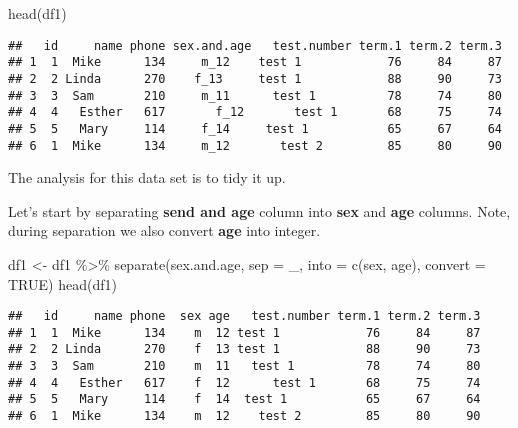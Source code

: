 \documentclass[
]{article}
\newenvironment{Shaded}{\begin{snugshade}}{\end{snugshade}}
\newcommand{\AttributeTok}[1]{\textcolor[rgb]{0.77,0.63,0.00}{#1}}
\newcommand{\ConstantTok}[1]{\textcolor[rgb]{0.00,0.00,0.00}{#1}}
\newcommand{\FunctionTok}[1]{\textcolor[rgb]{0.00,0.00,0.00}{#1}}
\newcommand{\NormalTok}[1]{#1}
\newcommand{\OtherTok}[1]{\textcolor[rgb]{0.56,0.35,0.01}{#1}}
\newcommand{\SpecialCharTok}[1]{\textcolor[rgb]{0.00,0.00,0.00}{#1}}
\newcommand{\StringTok}[1]{\textcolor[rgb]{0.31,0.60,0.02}{#1}}
\begin{document}
\begin{Shaded}
\begin{Highlighting}[]
\FunctionTok{head}\NormalTok{(df1)}
\end{Highlighting}
\end{Shaded}

\begin{verbatim}
##   id     name phone sex.and.age   test.number term.1 term.2 term.3
## 1  1  Mike      134     m_12    test 1            76     84     87
## 2  2 Linda      270    f_13     test 1            88     90     73
## 3  3  Sam       210     m_11      test 1          78     74     80
## 4  4   Esther   617       f_12       test 1       68     75     74
## 5  5   Mary     114     f_14     test 1           65     67     64
## 6  1  Mike      134     m_12       test 2         85     80     90
\end{verbatim}

The analysis for this data set is to tidy it up.

Let's start by separating \textbf{send and age} column into \textbf{sex}
and \textbf{age} columns. Note, during separation we also convert
\textbf{age} into integer.

\begin{Shaded}
\begin{Highlighting}[]
\NormalTok{df1 }\OtherTok{\textless{}{-}}\NormalTok{ df1 }\SpecialCharTok{\%\textgreater{}\%}
    \FunctionTok{separate}\NormalTok{(}\StringTok{\textquotesingle{}sex.and.age\textquotesingle{}}\NormalTok{, }\AttributeTok{sep =} \StringTok{\textquotesingle{}\_\textquotesingle{}}\NormalTok{, }\AttributeTok{into =} \FunctionTok{c}\NormalTok{(}\StringTok{\textquotesingle{}sex\textquotesingle{}}\NormalTok{, }\StringTok{\textquotesingle{}age\textquotesingle{}}\NormalTok{), }\AttributeTok{convert =} \ConstantTok{TRUE}\NormalTok{)}
\FunctionTok{head}\NormalTok{(df1)}
\end{Highlighting}
\end{Shaded}

\begin{verbatim}
##   id     name phone  sex age   test.number term.1 term.2 term.3
## 1  1  Mike      134    m  12 test 1            76     84     87
## 2  2 Linda      270    f  13 test 1            88     90     73
## 3  3  Sam       210    m  11   test 1          78     74     80
## 4  4   Esther   617    f  12      test 1       68     75     74
## 5  5   Mary     114    f  14  test 1           65     67     64
## 6  1  Mike      134    m  12    test 2         85     80     90
\end{verbatim}
\end{document}
